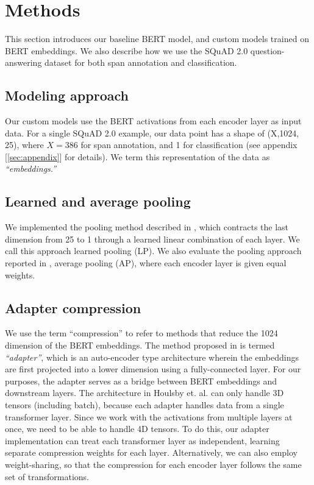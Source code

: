 \section{Methods}
\label{sec:methods}

This section introduces our baseline BERT model, and custom models trained on BERT embeddings. We also describe how we use the SQuAD 2.0 question-answering dataset for both span annotation and classification.

\subsection{Modeling approach}

Our custom models use the BERT activations from each encoder layer as input data. For a single SQuAD 2.0 example, our data point has a shape of (X,1024, 25), where $X=386$ for span annotation, and 1 for classification (see appendix [\ref{sec:appendix}] for details). We term this representation of the data as \textit{“embeddings.”}

\subsection{Learned and average pooling}

We implemented the pooling method described in \cite{tenney-etal-2019-bert}, which contracts the last dimension from 25 to 1 through a learned linear combination of each layer. We call this approach learned pooling (LP). We also evaluate the pooling approach reported in \cite{ma2019universal}, average pooling (AP), where each encoder layer is given equal weights. 

\subsection{Adapter compression}

We use the term “compression” to refer to methods that reduce the 1024 dimension of the BERT embeddings. The method proposed in \cite{DBLP:journals/corr/abs-1902-00751} is termed \textit{“adapter”}, which is an auto-encoder type architecture wherein the embeddings are first projected into a lower dimension using a fully-connected layer. For our purposes, the adapter serves as a bridge between BERT embeddings and downstream layers. The architecture in Houlsby et. al. can only handle 3D tensors (including batch), because each adapter handles data from a single transformer layer. Since we work with the activations from multiple layers at once, we need to be able to handle 4D tensors. To do this, our adapter implementation can treat each transformer layer as independent, learning separate compression weights for each layer. Alternatively, we can also employ weight-sharing, so that the compression for each encoder layer follows the same set of transformations.

